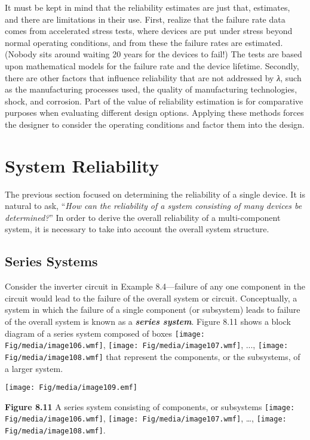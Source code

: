 It must be kept in mind that the reliability estimates are just that,
estimates, and there are limitations in their use. First, realize that
the failure rate data comes from accelerated stress tests, where devices
are put under stress beyond normal operating conditions, and from these
the failure rates are estimated. (Nobody sits around waiting 20 years
for the devices to fail!) The tests are based upon mathematical models
for the failure rate and the device lifetime. Secondly, there are other
factors that influence reliability that are not addressed by \emph{λ},
such as the manufacturing processes used, the quality of manufacturing
technologies, shock, and corrosion. Part of the value of reliability
estimation is for comparative purposes when evaluating different design
options. Applying these methods forces the designer to consider the
operating conditions and factor them into the design.

\section{System Reliability}\label{system-reliability-1}

The previous section focused on determining the reliability of a single
device. It is natural to ask, ``\emph{How can the reliability of a
system consisting of many devices be determined?}'' In order to derive
the overall reliability of a multi-component system, it is necessary to
take into account the overall system structure.

\subsection{Series Systems}\label{series-systems}

Consider the inverter circuit in Example 8.4---failure of any one
component in the circuit would lead to the failure of the overall system
or circuit. Conceptually, a system in which the failure of a single
component (or subsystem) leads to failure of the overall system is known
as a \emph{\textbf{series system}}. Figure 8.11 shows a block diagram of
a series system composed of boxes
\texttt{[image: Fig/media/image106.wmf]},
\texttt{[image: Fig/media/image107.wmf]}, ...,
\texttt{[image: Fig/media/image108.wmf]} that represent the components,
or the subsystems, of a larger system.

\texttt{[image: Fig/media/image109.emf]}

\textbf{Figure 8.11} A series system consisting of components, or
subsystems \texttt{[image: Fig/media/image106.wmf]},
\texttt{[image: Fig/media/image107.wmf]}, \ldots,
\texttt{[image: Fig/media/image108.wmf]}.

